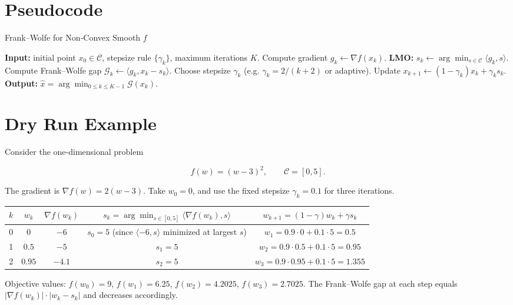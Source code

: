 \documentclass{article}
\newcommand{\gap}{\mathcal{G}}
\begin{document}
\section*{Pseudocode}
\begin{algorithm}[H]
\caption{Frank–Wolfe for Non‑Convex Smooth $f$}
\begin{algorithmic}[1]
\State \textbf{Input:} initial point $x_{0}\in\mathcal C$, stepsize rule $\{\gamma_{k}\}$, 
maximum iterations $K$.
    \State Compute gradient $g_{k}\gets \nabla f(x_{k})$.
    \State \textbf{LMO:} $s_{k}\gets \arg\min_{s\in\mathcal C}\langle g_{k},s\rangle$.
    \State Compute Frank–Wolfe gap $\gap_{k}\gets \langle g_{k},x_{k}-s_{k}\rangle$.
    \State Choose stepsize $\gamma_{k}$ (e.g. $\gamma_{k}=2/(k+2)$ or adaptive).
    \State Update $x_{k+1}\gets (1-\gamma_{k})x_{k}+ \gamma_{k}s_{k}$.
\EndFor
\State \textbf{Output:} $\displaystyle \hat x = \arg\min_{0\le k\le K-1}\gap(x_{k})$.
\end{algorithmic}
\end{algorithm}
\section*{Dry Run Example}
Consider the one‑dimensional problem  

\[
f(w)=(w-3)^{2},\qquad \mathcal C=[0,5].
\]

The gradient is $\nabla f(w)=2(w-3)$.  
Take $w_{0}=0$, and use the fixed stepsize $\gamma_{k}=0.1$ for three iterations.

\begin{center}
\begin{tabular}{c|c|c|c|c}
$k$ & $w_{k}$ & $\nabla f(w_{k})$ & $s_{k}=\arg\min_{s\in[0,5]}\langle\nabla f(w_{k}),s\rangle$ & $w_{k+1}= (1-\gamma)w_{k}+\gamma s_{k}$ \\ \hline
0 & $0$ & $-6$ & $\displaystyle s_{0}=5$ (since $\langle-6,s\rangle$ minimized at largest $s$) & $w_{1}=0.9\cdot0+0.1\cdot5=0.5$ \\
1 & $0.5$ & $-5$ & $s_{1}=5$ & $w_{2}=0.9\cdot0.5+0.1\cdot5=0.95$ \\
2 & $0.95$ & $-4.1$ & $s_{2}=5$ & $w_{3}=0.9\cdot0.95+0.1\cdot5=1.355$ 
\end{tabular}
\end{center}

Objective values: $f(w_{0})=9$, $f(w_{1})=6.25$, $f(w_{2})=4.2025$, $f(w_{3})=2.7025$.  
The Frank–Wolfe gap at each step equals $|\nabla f(w_{k})|\cdot|w_{k}-s_{k}|$ and decreases accordingly.
\end{document}
